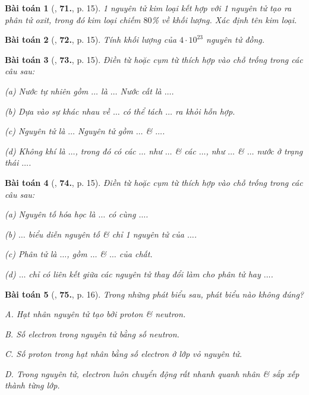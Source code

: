 \documentclass{article}
\numberwithin{equation}{section}
\newtheorem{baitoan}{Bài toán}[section]
\begin{document}
\begin{baitoan}[\cite{An2011}, \textbf{71.}, p. 15]
	1 nguyên tử kim loại kết hợp với 1 nguyên tử  tạo ra phân tử oxit, trong đó kim loại chiếm $80$\% về khối lượng. Xác định tên kim loại.
\end{baitoan}

\begin{baitoan}[\cite{An2011}, \textbf{72.}, p. 15]
	Tính khối lượng của $4\cdot 10^{23}$ nguyên tử đồng.
\end{baitoan}

\begin{baitoan}[\cite{An2011}, \textbf{73.}, p. 15]
	Điền từ hoặc cụm từ thích hợp vào chỗ trống trong các câu sau:
	\begin{enumerate*}
		\item[(a)] Nước tự nhiên gồm $\ldots$ là $\ldots$ Nước cất là $\ldots$.
		\item[(b)] Dựa vào sự khác nhau về $\ldots$ có thể tách $\ldots$ ra khỏi hỗn hợp.
		\item[(c)] Nguyên tử là $\ldots$ Nguyên tử gồm $\ldots$ \& $\ldots$.
		\item[(d)] Không khí là $\ldots$, trong đó có các $\ldots$ như $\ldots$ \& các $\ldots$, như $\ldots$ \& $\ldots$ nước ở trạng thái $\ldots$.
	\end{enumerate*}
\end{baitoan}

\begin{baitoan}[\cite{An2011}, \textbf{74.}, p. 15]
	Điền từ hoặc cụm từ thích hợp vào chỗ trống trong các câu sau:
	\begin{enumerate*}
		\item[(a)] Nguyên tố hóa học là $\ldots$ có cùng $\ldots$.
		\item[(b)] $\ldots$ biểu diễn nguyên tố \& chỉ 1 nguyên tử của $\ldots$.
		\item[(c)] Phân tử là $\ldots$, gồm $\ldots$ \& $\ldots$ của chất.
		\item[(d)] $\ldots$ chỉ có liên kết giữa các nguyên tử thay đổi làm cho phân tử hay $\ldots$.
	\end{enumerate*}
\end{baitoan}

\begin{baitoan}[\cite{An2011}, \textbf{75.}, p. 16]
	Trong những phát biểu sau, phát biểu nào không đúng?
	\begin{enumerate*}
		\item[{\rm\sf A.}] Hạt nhân nguyên tử tạo bởi proton \& neutron.
		\item[{\rm\sf B.}] Số electron trong nguyên tử bằng số neutron.
		\item[{\rm\sf C.}] Số proton trong hạt nhân bằng số electron ở lớp vỏ nguyên tử.
		\item[{\rm\sf D.}] Trong nguyên tử, electron luôn chuyển động rất nhanh quanh nhân \& sắp xếp thành từng lớp.
	\end{enumerate*}
\end{baitoan}
\end{document}
